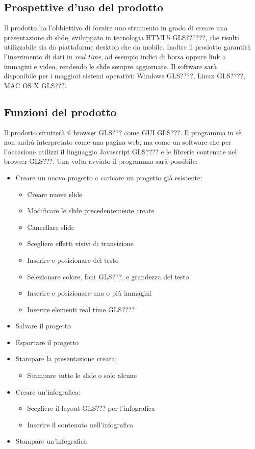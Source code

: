 \subsection{Prospettive d'uso del prodotto}
Il prodotto ha l'obbiettivo di fornire uno strumento in grado di creare una presentazione di slide, sviluppato in tecnologia HTML5 GLS??????, che risulti utilizzabile sia da piattaforme desktop che da mobile. Inoltre il prodotto garantirà l'inserimento di dati in \textit{real time}, ad esempio indici di borsa oppure link a immagini e video, rendendo le slide sempre aggiornate. Il software sarà disponibile per i maggiori sistemi operativi: Windows GLS????, Linux GLS????, MAC OS X GLS???.

\subsection{Funzioni del prodotto}
Il prodotto sfrutterà il browser GLS??? come GUI GLS???. Il programma in sè non andrà interpretato come una pagina web, ma come un software che per l'occasione utilizzi il linguaggio Javascript GLS???? e le librerie contenute nel browser GLS???.
Una volta avviato il programma sarà possibile:
\begin{itemize}
	\item Creare un nuovo progetto o caricare un progetto già esistente:
	\begin{itemize}
		\item Creare nuove slide
		\item Modificare le slide precedentemente create
		\item Cancellare slide
		\item Scegliere effetti visivi di transizione
		\item Inserire e posizionare del testo
		\item Selezionare colore, font GLS???, e grandezza del testo
		\item Inserire e posizionare una o più immagini
		\item Inserire elementi real time GLS????
	\end{itemize}
	\item Salvare il progetto
	\item Esportare il progetto
	\item Stampare la presentazione creata:
	\begin{itemize}
		\item Stampare tutte le slide o solo alcune
	\end{itemize}
	\item Creare un'infografica:
	\begin{itemize}
		\item Scegliere il layout GLS??? per l'infografica
		\item Inserire il contenuto nell'infografica
	\end{itemize}
	\item Stampare un'infografica
\end{itemize}

